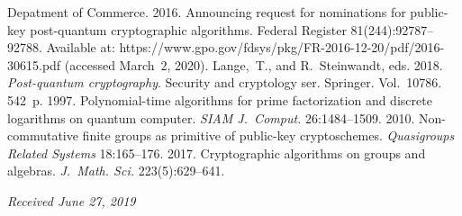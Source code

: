   



 



  \begin{multicols}{2}

\renewcommand{\bibname}{\protect\rmfamily References}

{\small\frenchspacing
 {%
 \begin{thebibliography}{9}
 Depatment of Commerce. 2016. Announcing request for nominations for 
 public-key post-quantum cryptographic algorithms. Federal Register 
81(244):92787--92788. Available at: 
{\sf https://www.gpo.gov/fdsys/pkg/FR-2016-12-20/pdf/2016-30615.pdf} (accessed 
March~2, 2020).
Lange,~T., and R.~Steinwandt, eds.
2018. \textit{Post-quantum cryptography}. Security and cryptology ser.
Springer. Vol.~10786. 542~p.
 1997. Polynomial-time algorithms for prime factorization and 
discrete logarithms on quantum computer. \textit{SIAM J.~Comput.} 
26:1484--1509.
 2010. Non-commutative finite groups as primitive of 
public-key cryptoschemes. \textit{Quasigroups Related Systems} 18:165--176.
 2017. Cryptographic algorithms on groups and algebras. 
\textit{J.~Math. Sci.} 223(5):629--641.
 \end{thebibliography}

 }
 }

\end{multicols}


\hfill{\small\textit{Received June 27, 2019}}


  
  \Contr
  
